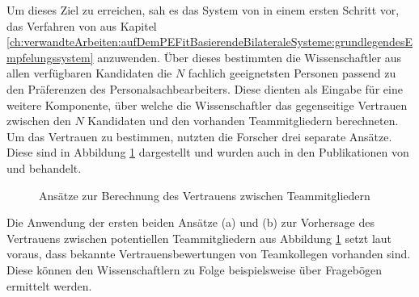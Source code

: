Um dieses Ziel zu erreichen, sah es das System von \textcite[S. 4ff.]{malinowski:2005} in einem ersten Schritt vor, das Verfahren von \textcite[S. 8ff.]{faerber:2003} aus Kapitel \ref{ch:verwandteArbeiten:aufDemPEFitBasierendeBilateraleSysteme:grundlegendesEmpfelungssystem} anzuwenden. Über dieses bestimmten die Wissenschaftler aus allen verfügbaren Kandidaten die $N$ fachlich geeignetsten Personen passend zu den Präferenzen des Personalsachbearbeiters. Diese dienten als Eingabe für eine weitere Komponente, über welche die Wissenschaftler das gegenseitige Vertrauen zwischen den $N$ Kandidaten und den vorhanden Teammitgliedern berechneten. Um das Vertrauen zu bestimmen, nutzten die Forscher drei separate Ansätze. Diese sind in Abbildung \ref{fig:verwandteArbeiten:abb2} dargestellt und wurden auch in den Publikationen von \textcite[S. 5ff.]{keim:2005} und \textcite[S. 6ff.]{malinowski:2008} behandelt.

\begin{figure}[h]
	\centering
	
	
	\caption{Ansätze zur Berechnung des Vertrauens zwischen Teammitgliedern \cite[S. 5]{malinowski:2005}}
	\label{fig:verwandteArbeiten:abb2}
\end{figure}

Die Anwendung der ersten beiden Ansätze (a) und (b) zur Vorhersage des Vertrauens zwischen potentiellen Teammitgliedern aus Abbildung \ref{fig:verwandteArbeiten:abb2} setzt laut \textcite[S. 4ff.]{malinowski:2005} voraus, dass bekannte Vertrauensbewertungen von Teamkollegen vorhanden sind. Diese können den Wissenschaftlern zu Folge beispielsweise über Fragebögen ermittelt werden.

